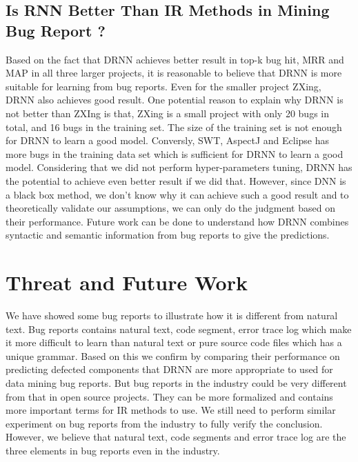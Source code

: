 \subsection{Is RNN Better Than IR Methods in Mining Bug Report ?}
Based on the fact that DRNN achieves better result in top-k bug hit, MRR and MAP in all three larger projects, it is reasonable to believe that DRNN is more suitable for learning from bug reports. Even for the smaller project ZXing, DRNN also achieves good result. 
One potential reason to explain why DRNN is not better than ZXIng is that, ZXing is a small project with only 20 bugs in total, and 16 bugs in the training set. The size of the training set is not enough for DRNN to learn a good model. 
Conversly, SWT, AspectJ and Eclipse has more bugs in the training data set which is sufficient for DRNN to learn a good model.
Considering that we did not perform hyper-parameters tuning, DRNN has the potential to achieve even better result if we did that. 
However, since DNN is a black box method, we don't know why it can achieve such a good result and to theoretically validate our assumptions, we can only do the judgment based on their performance. 
Future work can be done to understand how DRNN combines syntactic and semantic information from bug reports to give the predictions.
 

\section{Threat and Future Work}
We have showed some bug reports to illustrate how it is different from natural text. Bug reports contains natural text, code segment, error trace log which make it more difficult to learn than natural text or pure source code files which has a unique grammar. Based on this we confirm by comparing their performance on predicting defected components that DRNN are more appropriate to used for data mining bug reports. 
But bug reports in the industry could be very different from that in open source projects. 
They can be more formalized and contains more important terms for IR methods to use. 
We still need to perform similar experiment on bug reports from the industry to fully verify the conclusion. 
However, we believe that natural text, code segments and error trace log are the three elements in bug reports even in the industry. 

